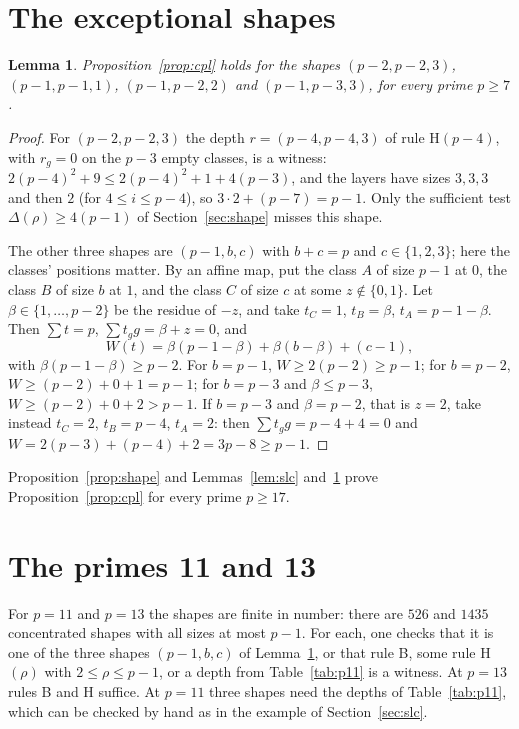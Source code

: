 \documentclass[11pt]{article}
\newtheorem{lemma}{Lemma}[section]
\theoremstyle{remark}
\begin{document}
\section{The exceptional shapes}\label{sec:exceptional}

\begin{lemma}\label{lem:exc}
Proposition~\ref{prop:cpl} holds for the shapes $(p-2,p-2,3)$, $(p-1,p-1,1)$, $(p-1,p-2,2)$ and $(p-1,p-3,3)$, for every prime $p\ge7$.
\end{lemma}

\begin{proof}
For $(p-2,p-2,3)$ the depth $r=(p-4,p-4,3)$ of rule H$(p-4)$, with $r_g=0$ on the $p-3$ empty classes, is a witness: $2(p-4)^2+9\le2(p-4)^2+1+4(p-3)$, and the layers have sizes $3,3,3$ and then $2$ (for $4\le i\le p-4$), so $3\cdot2+(p-7)=p-1$. Only the sufficient test $\Delta(\rho)\ge4(p-1)$ of Section~\ref{sec:shape} misses this shape.

The other three shapes are $(p-1,b,c)$ with $b+c=p$ and $c\in\{1,2,3\}$; here the classes' positions matter. By an affine map, put the class $A$ of size $p-1$ at $0$, the class $B$ of size $b$ at $1$, and the class $C$ of size $c$ at some $z\notin\{0,1\}$. Let $\beta\in\{1,\dots,p-2\}$ be the residue of $-z$, and take $t_C=1$, $t_B=\beta$, $t_A=p-1-\beta$. Then $\sum t=p$, $\sum t_g g=\beta+z=0$, and
\[
W(t)=\beta(p-1-\beta)+\beta(b-\beta)+(c-1),
\]
with $\beta(p-1-\beta)\ge p-2$. For $b=p-1$, $W\ge2(p-2)\ge p-1$; for $b=p-2$, $W\ge(p-2)+0+1=p-1$; for $b=p-3$ and $\beta\le p-3$, $W\ge(p-2)+0+2>p-1$. If $b=p-3$ and $\beta=p-2$, that is $z=2$, take instead $t_C=2$, $t_B=p-4$, $t_A=2$: then $\sum t_g g=p-4+4=0$ and $W=2(p-3)+(p-4)+2=3p-8\ge p-1$.
\end{proof}

Proposition~\ref{prop:shape} and Lemmas~\ref{lem:slc} and~\ref{lem:exc} prove Proposition~\ref{prop:cpl} for every prime $p\ge17$.

\section{The primes 11 and 13}\label{sec:small}

For $p=11$ and $p=13$ the shapes are finite in number: there are $526$ and $1435$ concentrated shapes with all sizes at most $p-1$. For each, one checks that it is one of the three shapes $(p-1,b,c)$ of Lemma~\ref{lem:exc}, or that rule B, some rule H$(\rho)$ with $2\le\rho\le p-1$, or a depth from Table~\ref{tab:p11} is a witness. At $p=13$ rules B and H suffice. At $p=11$ three shapes need the depths of Table~\ref{tab:p11}, which can be checked by hand as in the example of Section~\ref{sec:slc}.
\end{document}
